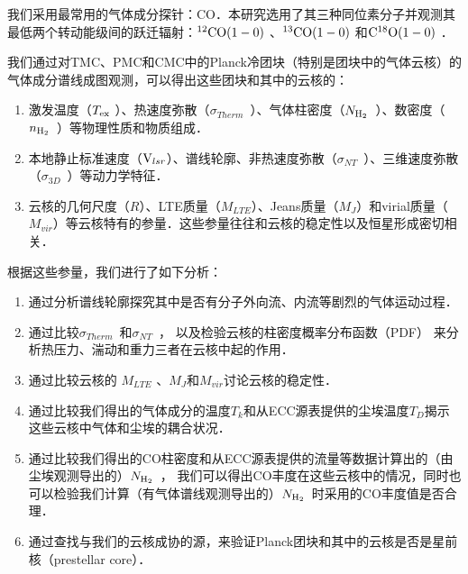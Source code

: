 \documentclass[UTF8, nocolorlinks]{pkuthss}
\newcommand{\coaa}{$\rm^{12}CO(1-0)$ }
\newcommand{\cobb}{$\rm^{13}CO(1-0)$ }
\newcommand{\cocc}{$\rm C^{18}O(1-0)$ }
\newcommand{\vlsr}{${\rm V } _{lsr}$}
\newcommand{\texc}{$T_{\rm {ex}}$ }
\newcommand{\nhyd}{$N_{\rm H_2}$\ }
\newcommand{\nnhyd}{$n_{\rm H_2}$\ }
\newcommand{\sigmath}{$\sigma _{Therm}$\ }
\newcommand{\sigmant}{$\sigma _{NT}$\ }
\newcommand{\sigmatd}{$\sigma _{3D}$\ }
\begin{document}
		我们采用最常用的气体成分探针：CO．本研究选用了其三种同位素分子并观测其最低两个转动能级间的跃迁辐射：\coaa 、\cobb  和\cocc ．

		我们通过对TMC、PMC和CMC中的Planck冷团块（特别是团块中的气体云核）的气体成分谱线成图观测，可以得出这些团块和其中的云核的：

		\begin{adjustwidth}{0.5cm}{0cm}
		\begin{enumerate}
			\item 激发温度（\texc ）、热速度弥散（\sigmath ）、气体柱密度（\nhyd ）、数密度（\nnhyd ）等物理性质和物质组成．

			\item 本地静止标准速度（\vlsr ）、谱线轮廓、非热速度弥散（\sigmant ）、三维速度弥散（\sigmatd ）等动力学特征．

			\item 云核的几何尺度（$R$）、LTE质量（$M_{LTE}$）、Jeans质量（$M_{J}$）和virial质量（$M_{vir}$）等云核特有的参量．这些参量往往和云核的稳定性以及恒星形成密切相关．
		\end{enumerate}
		\end{adjustwidth}
		
		根据这些参量，我们进行了如下分析：

		\begin{adjustwidth}{0.5cm}{0cm}
		\begin{enumerate}
			\item 通过分析谱线轮廓探究其中是否有分子外向流、内流等剧烈的气体运动过程．

			\item 通过比较\sigmath 和\sigmant ， 以及检验云核的柱密度概率分布函数（PDF） 来分析热压力、湍动和重力三者在云核中起的作用．

			\item 通过比较云核的 $M_{LTE}$ 、$M_{J}$和$M_{vir}$讨论云核的稳定性．

			\item 通过比较我们得出的气体成分的温度$T_k$和从ECC源表提供的尘埃温度$T_D$揭示这些云核中气体和尘埃的耦合状况．

			\item 通过比较我们得出的CO柱密度和从ECC源表提供的流量等数据计算出的（由尘埃观测导出的）\nhyd， 我们可以得出CO丰度在这些云核中的情况，同时也可以检验我们计算（有气体谱线观测导出的）\nhyd 时采用的CO丰度值是否合理．

			\item 通过查找与我们的云核成协的源，来验证Planck团块和其中的云核是否是星前核（prestellar core）．
		\end{enumerate}
		\end{adjustwidth}
\end{document}
